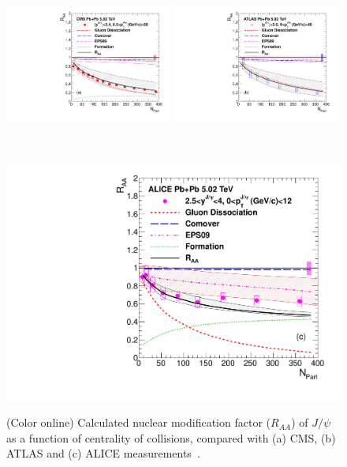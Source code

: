 \documentclass[12pt,a4paper,final]{iopart} %
\newcommand{\Jpsi}{J/\psi}
\begin{document}
\begin{figure}
\begin{minipage}{1.0\linewidth}
\centering
{\includegraphics[width=0.49\textwidth]{Fig6a_CMS_RAANPart_Shade.pdf}}
{\includegraphics[width=0.49\textwidth]{Fig6b_ATLAS_RAANPart_Shade.pdf}}
\end{minipage}%
\ \\
\centering
\begin{minipage}{0.5\linewidth}
\centering
{\includegraphics[width=1.0\textwidth]{Fig6c_ALICE_RAANPart_Shade.pdf}}
\end{minipage}%
\caption{(Color online) Calculated nuclear modification factor ($R_{AA}$) of $\Jpsi$ as a function
  of centrality of collisions, compared with (a) CMS, (b) ATLAS and (c) ALICE
  measurements~\cite{Sirunyan:2017isk,ATLAS:2016qpn,Adam:2016rdg}.}
\label{fig:JPsiRaaVsNPart}
\end{figure}
\end{document}

